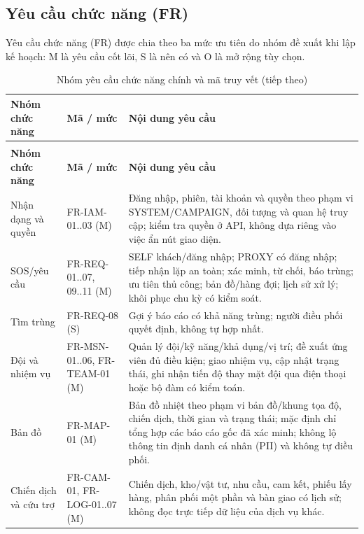 \documentclass[12pt,a4paper,oneside]{report}
\begin{document}
\subsection{Yêu cầu chức năng (FR)}
Yêu cầu chức năng (FR) được chia theo ba mức ưu tiên do nhóm đề xuất khi lập kế hoạch: M là yêu cầu cốt lõi, S là nên có và O là mở rộng tùy chọn.
\small
\begin{longtable}{|L{2.7cm}|L{2.4cm}|L{9.5cm}|}
  \caption{Nhóm yêu cầu chức năng chính và mã truy vết}\label{tab:fr-groups}\\
    \hline
    \centering\textbf{Nhóm chức năng} & \centering\textbf{Mã / mức} & \centering\arraybackslash\textbf{Nội dung yêu cầu} \\
    \hline
    \endfirsthead
    \caption[]{Nhóm yêu cầu chức năng chính và mã truy vết (tiếp theo)}\\
    \hline
    \centering\textbf{Nhóm chức năng} & \centering\textbf{Mã / mức} & \centering\arraybackslash\textbf{Nội dung yêu cầu} \\
    \hline
    \endhead
    Nhận dạng và quyền & FR-IAM-01..03 (M) & Đăng nhập, phiên, tài khoản và quyền theo phạm vi SYSTEM/CAMPAIGN, đối tượng và quan hệ truy cập; kiểm tra quyền ở API, không dựa riêng vào việc ẩn nút giao diện. \\
    \hline
    SOS/yêu cầu & FR-REQ-01..07, 09..11 (M) & SELF khách/đăng nhập; PROXY có đăng nhập; tiếp nhận lặp an toàn; xác minh, từ chối, báo trùng; ưu tiên thủ công; bản đồ/hàng đợi; lịch sử xử lý; khôi phục chu kỳ có kiểm soát. \\
    \hline
    Tìm trùng & FR-REQ-08 (S) & Gợi ý báo cáo có khả năng trùng; người điều phối quyết định, không tự hợp nhất. \\
    \hline
    Đội và nhiệm vụ & FR-MSN-01..06, FR-TEAM-01 (M) & Quản lý đội/kỹ năng/khả dụng/vị trí; đề xuất ứng viên đủ điều kiện; giao nhiệm vụ, cập nhật trạng thái, ghi nhận tiến độ thay mặt đội qua điện thoại hoặc bộ đàm có kiểm toán. \\
    \hline
    Bản đồ & FR-MAP-01 (M) & Bản đồ nhiệt theo phạm vi bản đồ/khung tọa độ, chiến dịch, thời gian và trạng thái; mặc định chỉ tổng hợp các báo cáo gốc đã xác minh; không lộ thông tin định danh cá nhân (PII) và không tự điều phối. \\
    \hline
    Chiến dịch và cứu trợ & FR-CAM-01, FR-LOG-01..07 (M) & Chiến dịch, kho/vật tư, nhu cầu, cam kết, phiếu lấy hàng, phân phối một phần và bàn giao có lịch sử; không đọc trực tiếp dữ liệu của dịch vụ khác. \\
    \hline

\end{longtable}
\end{document}
